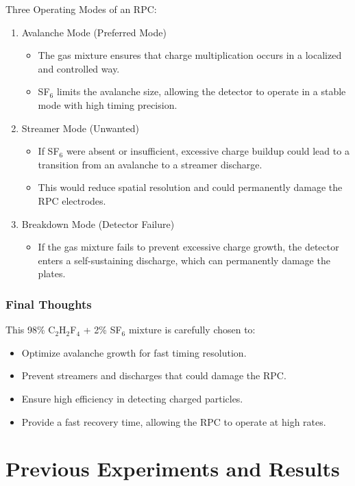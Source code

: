 Three Operating Modes of an RPC:

\begin{enumerate}
	\item Avalanche Mode (Preferred Mode)
	\begin{itemize}
		\item The gas mixture ensures that charge multiplication occurs in a localized and controlled way.
		\item SF$_6$ limits the avalanche size, allowing the detector to operate in a stable mode with high timing precision.
	\end{itemize}
	\item Streamer Mode (Unwanted)
	\begin{itemize}
		\item If SF$_6$ were absent or insufficient, excessive charge buildup could lead to a transition from an avalanche to a streamer discharge.
		\item This would reduce spatial resolution and could permanently damage the RPC electrodes.
	\end{itemize}
	\item Breakdown Mode (Detector Failure)
	\begin{itemize}
		\item If the gas mixture fails to prevent excessive charge growth, the detector enters a self-sustaining discharge, which can permanently damage the plates.
	\end{itemize}
\end{enumerate}

\subsubsection{Final Thoughts}

This 98\% C$_2$H$_2$F$_4$ + 2\% SF$_6$ mixture is carefully chosen to:

\begin{itemize}
	\item Optimize avalanche growth for fast timing resolution.
	\item Prevent streamers and discharges that could damage the RPC.
	\item Ensure high efficiency in detecting charged particles.
	\item Provide a fast recovery time, allowing the RPC to operate at high rates.
\end{itemize}



\section{Previous Experiments and Results}

